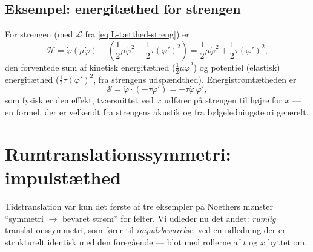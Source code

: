 \subsection{Eksempel: energitæthed for strengen}

\begin{eksempel}
For strengen (med $\mathcal{L}$ fra \eqref{eq:L-tætthed-streng}) er
\begin{equation}
  \mathcal{H} = \dot\varphi(\mu\dot\varphi) - \left(\frac12\mu\dot\varphi^2-\frac12\tau(\varphi')^2\right)
  = \frac12\mu\dot\varphi^2 + \frac12\tau(\varphi')^2,
\end{equation}
den forventede sum af kinetisk energitæthed ($\frac12\mu\dot\varphi^2$)
og potentiel (elastisk) energitæthed ($\frac12\tau(\varphi')^2$, fra
strengens udspændthed). Energistrømtætheden er
\begin{equation}
  \mathcal{S} = \dot\varphi\cdot(-\tau\varphi') = -\tau\dot\varphi\,\varphi',
\end{equation}
som fysisk er den effekt, tværsnittet ved $x$ udfører på strengen til
højre for $x$ — en formel, der er velkendt fra strengens akustik og
fra bølgeledningsteori generelt.
\end{eksempel}

\section{Rumtranslationssymmetri: impulstæthed}
\label{sec:rum-translation}

Tidstranslation var kun det første af tre eksempler på Noethers
mønster ``symmetri $\to$ bevaret strøm'' for felter. Vi udleder nu det
andet: \emph{rumlig} translationssymmetri, som fører til
\emph{impulsbevarelse}, ved en udledning der er strukturelt identisk
med den foregående — blot med rollerne af $t$ og $x$ byttet om.

